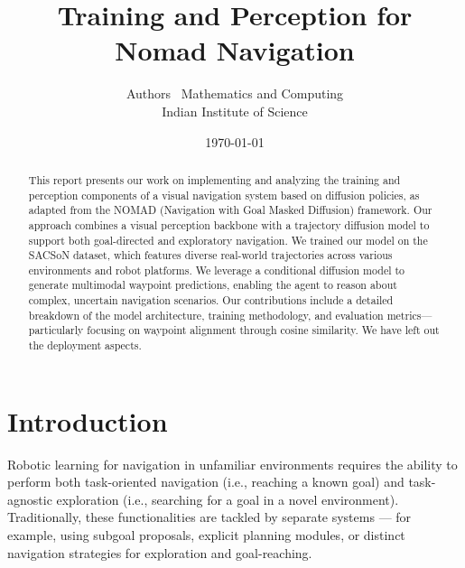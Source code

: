 \documentclass[12pt]{article}
\title{Training and Perception for Nomad Navigation}
\author{Authors \ Mathematics and Computing \\ Indian Institute of Science}
\date{\today}
\begin{document}
\maketitle

\begin{abstract}
This report presents our work on implementing and analyzing the training and perception components of a visual navigation system based on diffusion policies, as adapted from the NOMAD (Navigation with Goal Masked Diffusion) framework. 
Our approach combines a visual perception backbone with a trajectory diffusion model to support both goal-directed and exploratory navigation. We trained our model on the SACSoN dataset, which features diverse real-world trajectories across various environments and robot platforms. 
We leverage a conditional diffusion model to generate multimodal waypoint predictions, enabling the agent to reason about complex, uncertain navigation scenarios. Our contributions include a detailed breakdown of the model architecture, training methodology, and evaluation metrics—particularly focusing on waypoint alignment through cosine similarity. 
We have left out the deployment aspects.
\end{abstract}

\section{Introduction}
Robotic learning for navigation in unfamiliar environments requires the ability to perform both task-oriented navigation (i.e., reaching a known goal) and task-agnostic exploration (i.e., searching for a goal in a novel environment). Traditionally, these functionalities are tackled by separate systems — for example, using subgoal proposals, explicit planning modules, or distinct navigation strategies for exploration and goal-reaching.
\end{document}
